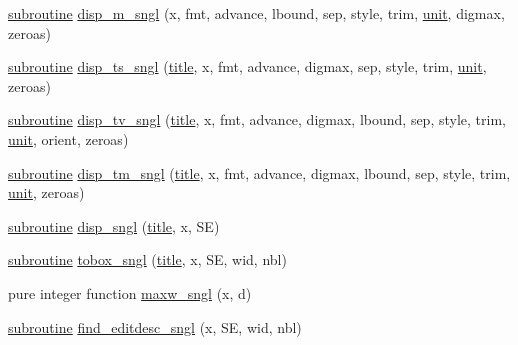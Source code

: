 \begin{DoxyCompactItemize}
\item 
\hyperlink{M__stopwatch_83_8txt_acfbcff50169d691ff02d4a123ed70482}{subroutine} \hyperlink{namespacem__display_a4930462636c070e8b4761167fadfd4f9}{disp\+\_\+m\+\_\+sngl} (x, fmt, advance, lbound, sep, style, trim, \hyperlink{M__stopwatch_83_8txt_a5cbef30eb7c0d734bd82f5a7ebea9aa7}{unit}, digmax, zeroas)
\item 
\hyperlink{M__stopwatch_83_8txt_acfbcff50169d691ff02d4a123ed70482}{subroutine} \hyperlink{namespacem__display_a7ecc86ce58006c0d4d08efcfdaaf479a}{disp\+\_\+ts\+\_\+sngl} (\hyperlink{print__watch_83_8txt_a15b5bd21156bb9fca6a755ab8c029a9c}{title}, x, fmt, advance, digmax, sep, style, trim, \hyperlink{M__stopwatch_83_8txt_a5cbef30eb7c0d734bd82f5a7ebea9aa7}{unit}, zeroas)
\item 
\hyperlink{M__stopwatch_83_8txt_acfbcff50169d691ff02d4a123ed70482}{subroutine} \hyperlink{namespacem__display_ac54e50e6ecc87115c286fe451a4b8a13}{disp\+\_\+tv\+\_\+sngl} (\hyperlink{print__watch_83_8txt_a15b5bd21156bb9fca6a755ab8c029a9c}{title}, x, fmt, advance, digmax, lbound, sep, style, trim, \hyperlink{M__stopwatch_83_8txt_a5cbef30eb7c0d734bd82f5a7ebea9aa7}{unit}, orient, zeroas)
\item 
\hyperlink{M__stopwatch_83_8txt_acfbcff50169d691ff02d4a123ed70482}{subroutine} \hyperlink{namespacem__display_ae12795b79f66ff0f9f6843b2f980394a}{disp\+\_\+tm\+\_\+sngl} (\hyperlink{print__watch_83_8txt_a15b5bd21156bb9fca6a755ab8c029a9c}{title}, x, fmt, advance, digmax, lbound, sep, style, trim, \hyperlink{M__stopwatch_83_8txt_a5cbef30eb7c0d734bd82f5a7ebea9aa7}{unit}, zeroas)
\item 
\hyperlink{M__stopwatch_83_8txt_acfbcff50169d691ff02d4a123ed70482}{subroutine} \hyperlink{namespacem__display_a1e0883cef47c57b43c8de794fe7724ff}{disp\+\_\+sngl} (\hyperlink{print__watch_83_8txt_a15b5bd21156bb9fca6a755ab8c029a9c}{title}, x, SE)
\item 
\hyperlink{M__stopwatch_83_8txt_acfbcff50169d691ff02d4a123ed70482}{subroutine} \hyperlink{namespacem__display_a880ae5ed1f32412fadb1d1b91d406218}{tobox\+\_\+sngl} (\hyperlink{print__watch_83_8txt_a15b5bd21156bb9fca6a755ab8c029a9c}{title}, x, SE, wid, nbl)
\item 
pure integer function \hyperlink{namespacem__display_a7d542f36f022c67f2879318796f82e57}{maxw\+\_\+sngl} (x, d)
\item 
\hyperlink{M__stopwatch_83_8txt_acfbcff50169d691ff02d4a123ed70482}{subroutine} \hyperlink{namespacem__display_aa41974a4b32f6169cadb3da72991653f}{find\+\_\+editdesc\+\_\+sngl} (x, SE, wid, nbl)

\end{DoxyCompactItemize}

